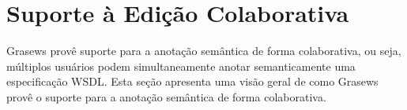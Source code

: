 \section{Suporte à Edição Colaborativa}\label{4-grasews-suporte-edicao-colaborativa}

Grasews provê suporte para a anotação semântica de forma colaborativa, ou seja, múltiplos usuários podem simultaneamente anotar semanticamente uma especificação WSDL. Esta seção apresenta uma visão geral de como Grasews provê o suporte para a anotação semântica de forma colaborativa.


